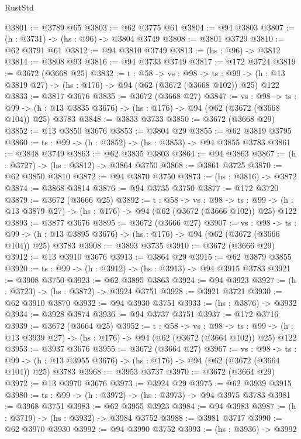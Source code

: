 \begin{lexlean}{RustStd}
\begin{coremodule}
{\begin{coremodule}
{{{{{{{{{@3801 := @3789 @65
@3803 := @62 @3775 @61
@3804 := @94 @3803
@3807 := (h : @3731) -> (hs : @96) -> @3804 @3749
@3808 := @3801 @3729
@3810 := @62 @3791 @61
@3812 := @94 @3810 @3749
@3813 := (hs : @96) -> @3812
@3814 := @3808 @93
@3816 := @94 @3733 @3749
@3817 := @172 @3724
@3819 := @3672 (@3668 @25)
@3832 := {t : @58} ->
  {vs : @98} ->
  {ts : @99} -> (h : @13 @3819 @27) -> (hs : @176) -> @94 (@62 (@3672 (@3668 @102)) @25) @122
@3833 := @3817 @3676
@3835 := @3672 (@3668 @27)
@3847 := {vs : @98} ->
  {ts : @99} -> (h : @13 @3835 @3676) -> (hs : @176) -> @94 (@62 (@3672 (@3668 @104)) @25) @3783
@3848 := @3833 @3733
@3850 := @3672 (@3668 @29)
@3852 := @13 @3850 @3676
@3853 := @3804 @29
@3855 := @62 @3819 @3795
@3860 := {ts : @99} -> (h : @3852) -> (hs : @3853) -> @94 @3855 @3783
@3861 := @3848 @3749
@3863 := @62 @3835 @3803
@3864 := @94 @3863
@3867 := (h : @3727) -> (hs : @3812) -> @3864 @3750
@3868 := @3861 @3725
@3870 := @62 @3850 @3810
@3872 := @94 @3870 @3750
@3873 := (hs : @3816) -> @3872
@3874 := @3868 @3814
@3876 := @94 @3735 @3750
@3877 := @172 @3720
@3879 := @3672 (@3666 @25)
@3892 := {t : @58} ->
  {vs : @98} ->
  {ts : @99} -> (h : @13 @3879 @27) -> (hs : @176) -> @94 (@62 (@3672 (@3666 @102)) @25) @122
@3893 := @3877 @3676
@3895 := @3672 (@3666 @27)
@3907 := {vs : @98} ->
  {ts : @99} -> (h : @13 @3895 @3676) -> (hs : @176) -> @94 (@62 (@3672 (@3666 @104)) @25) @3783
@3908 := @3893 @3735
@3910 := @3672 (@3666 @29)
@3912 := @13 @3910 @3676
@3913 := @3864 @29
@3915 := @62 @3879 @3855
@3920 := {ts : @99} -> (h : @3912) -> (hs : @3913) -> @94 @3915 @3783
@3921 := @3908 @3750
@3923 := @62 @3895 @3863
@3924 := @94 @3923
@3927 := (h : @3723) -> (hs : @3872) -> @3924 @3751
@3928 := @3921 @3721
@3930 := @62 @3910 @3870
@3932 := @94 @3930 @3751
@3933 := (hs : @3876) -> @3932
@3934 := @3928 @3874
@3936 := @94 @3737 @3751
@3937 := @172 @3716
@3939 := @3672 (@3664 @25)
@3952 := {t : @58} ->
  {vs : @98} ->
  {ts : @99} -> (h : @13 @3939 @27) -> (hs : @176) -> @94 (@62 (@3672 (@3664 @102)) @25) @122
@3953 := @3937 @3676
@3955 := @3672 (@3664 @27)
@3967 := {vs : @98} ->
  {ts : @99} -> (h : @13 @3955 @3676) -> (hs : @176) -> @94 (@62 (@3672 (@3664 @104)) @25) @3783
@3968 := @3953 @3737
@3970 := @3672 (@3664 @29)
@3972 := @13 @3970 @3676
@3973 := @3924 @29
@3975 := @62 @3939 @3915
@3980 := {ts : @99} -> (h : @3972) -> (hs : @3973) -> @94 @3975 @3783
@3981 := @3968 @3751
@3983 := @62 @3955 @3923
@3984 := @94 @3983
@3987 := (h : @3719) -> (hs : @3932) -> @3984 @3752
@3988 := @3981 @3717
@3990 := @62 @3970 @3930
@3992 := @94 @3990 @3752
@3993 := (hs : @3936) -> @3992
}}}}}}}}}
\end{coremodule}}
\end{coremodule}
\end{lexlean}
